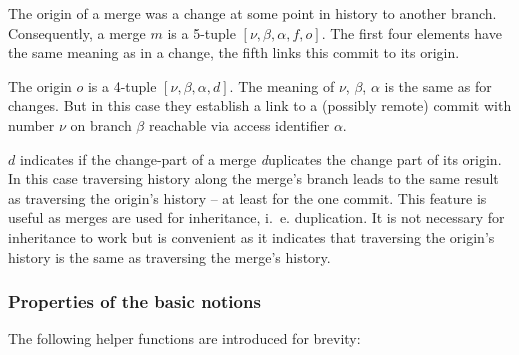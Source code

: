 \documentclass[fleqn, 10pt, a4paper]{article}
\begin{document}
The origin of a merge was a change at some
point in history to another branch. Consequently, a merge $m$ is
a 5-tuple $[\nu, \beta, \alpha, f, o]$. The first four elements
have the same meaning as in a change, the fifth links this commit
to its origin.

The origin $o$ is a 4-tuple $[\nu, \beta, \alpha, d]$. The meaning
of $\nu$, $\beta$, $\alpha$ is the same as for changes. But
in this case they establish a link to a (possibly remote)
commit with number $\nu$
on branch $\beta$ reachable via access identifier $\alpha$.

$d$ indicates if the change-part of a merge \emph{d}uplicates
the change part of its origin. In this case traversing history
along the merge's branch leads to the same result as traversing
the origin's history -- at least for the one commit.
This feature is useful as merges are used for inheritance, i.~e.
duplication. It is not necessary for inheritance to work but
is convenient as it indicates that traversing the origin's history
is the same as traversing the merge's history.

\subsubsection{Properties of the basic notions}

The following helper functions are introduced for brevity:
\end{document}
